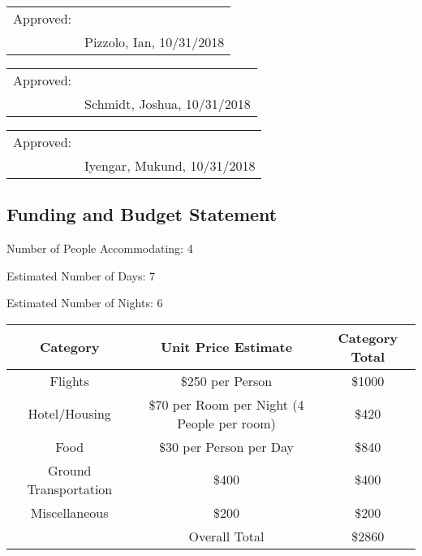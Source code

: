\documentclass{article}
\let\Oldsubsection\subsection
\renewcommand{\subsection}{\FloatBarrier\Oldsubsection}
\begin{document}
\bigskip
\bigskip
\bigskip

\begin{tabular}{@{}p{.5in}p{3.5in}@{}}
Approved: & \hrulefill \\
& Pizzolo, Ian, 10/31/2018\\
\end{tabular}

\bigskip
\bigskip
\bigskip

\begin{tabular}{@{}p{.5in}p{3.5in}@{}}
Approved: & \hrulefill \\
& Schmidt, Joshua, 10/31/2018\\
\end{tabular}

\bigskip
\bigskip
\bigskip

\begin{tabular}{@{}p{.5in}p{3.5in}@{}}
Approved: & \hrulefill \\
& Iyengar, Mukund, 10/31/2018\\
\end{tabular}

\newpage

\subsection{Funding and Budget Statement}

\bigskip

\hspace{4mm} Number of People Accommodating: 4

\bigskip

Estimated Number of Days: 7

\bigskip

Estimated Number of Nights: 6

\bigskip
\bigskip

\begin{tabular}{||c c c||} 
  \hline
  Category & Unit Price Estimate & Category Total \\ [0.5ex] 
  \hline\hline
  Flights & \$250 per Person & \$1000 \\ 
  \hline
  Hotel/Housing & \$70 per Room per Night (4 People per room) & \$420 \\
  \hline
  Food & \$30 per Person per Day & \$840 \\
  \hline
  Ground Transportation & \$400 & \$400 \\
  \hline
  Miscellaneous & \$200 & \$200 \\
  \hline
   & Overall Total & \$2860 \\
  \hline
 \end{tabular}
\end{document}
